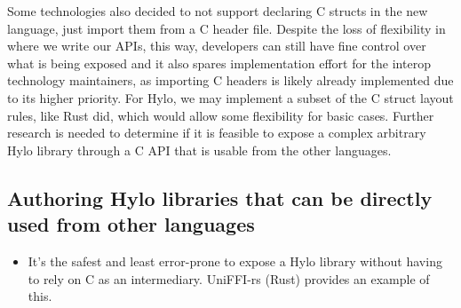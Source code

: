 Some technologies also decided to not support declaring C structs in the new language, just import them from a C header file. Despite the loss of flexibility in where we write our APIs, this way, developers can still have fine control over what is being exposed and it also spares implementation effort for the interop technology maintainers, as importing C headers is likely already implemented due to its higher priority. For Hylo, we may implement a subset of the C struct layout rules, like Rust did, which would allow some flexibility for basic cases. Further research is needed to determine if it is feasible to expose a complex arbitrary Hylo library through a C API that is usable from the other languages.

\subsection{Authoring Hylo libraries that can be directly used from other languages}
\begin{itemize}
\item It's the safest and least error-prone to expose a Hylo library without having to rely on C as an intermediary. UniFFI-rs (Rust) provides an example of this.
\end{itemize}
